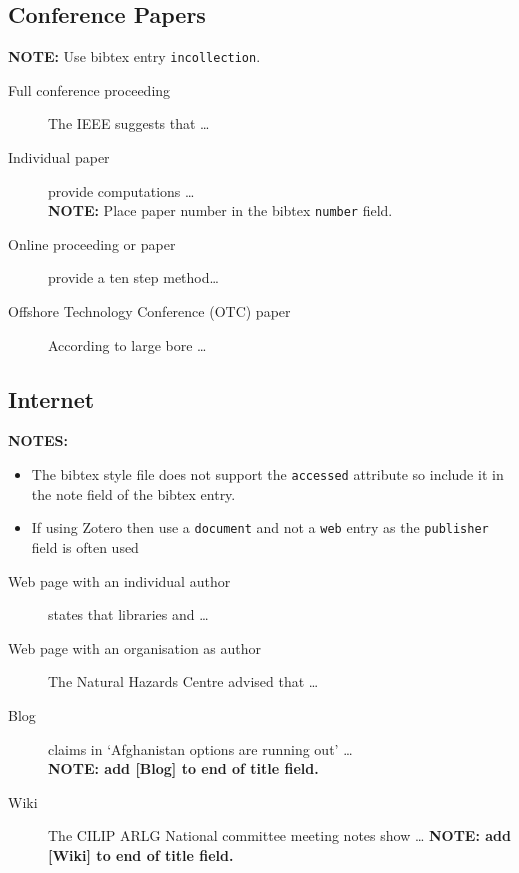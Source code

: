 \subsection{Conference Papers}
\label{sec:NumberedConference}
\textbf{NOTE:} Use bibtex entry \texttt{incollection}.
\begin{description}
\item[Full conference proceeding] The IEEE \cite[p.59]{noauthor_11_2010} suggests that \ldots
\item[Individual paper] \textcite{moon_aeroacoustic_2003} provide computations \ldots\\
\textbf{NOTE:} Place paper number in the bibtex \texttt{number} field.
\item[Online proceeding or paper] \textcite{wessel_assessing_2010} provide a ten step method\ldots
\item[Offshore Technology Conference (OTC) paper] According to \textcite{chiasson_large_1999} large bore \ldots
\end{description}

\subsection{Internet}
\label{sec:Internet}
\textbf{NOTES:} 
\begin{itemize}
\item The bibtex style file does not support the \texttt{accessed} attribute so include it in the note field of the bibtex entry.
\item If using Zotero then use a \texttt{document} and not a \texttt{web} entry as the \texttt{publisher} field is often used
\end{itemize}
\begin{description}
\item[Web page with an individual author] \textcite{bradley_notitle_2011} states that libraries and \ldots
\item[Web page with an organisation as author] The Natural Hazards Centre \cite{university_of_colorado_boulder_natural_2011} advised
that \ldots
\item[Blog] \textcite{borger_afghanistan_2010} claims in `Afghanistan
options are running out' \ldots\\
\textbf{NOTE: add [Blog] to end of title field.}
\item[Wiki] The CILIP ARLG National committee
meeting notes show \ldots \cite{barefoot_october_2012}
\textbf{NOTE: add [Wiki] to end of title field.}
\end{description}

